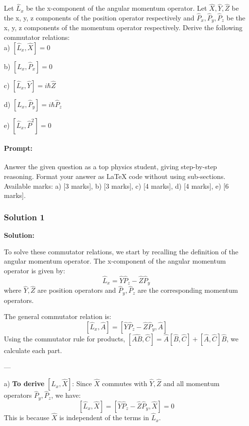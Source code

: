 \documentclass{article}
\begin{document}
Let $\hat{L}_x$ be the x-component of the angular momentum operator. Let $\hat{X}, \hat{Y}, \hat{Z}$ be the x, y, z components of the position operator respectively and $\hat{P}_x, \hat{P}_y, \hat{P}_z$ be the x, y, z components of the momentum operator respectively. Derive the following commutator relations:   \\

a) $\left[\hat{L}_x, \hat{X}\right] = 0$  

b) $\left[\hat{L}_x, \hat{P}_x\right] = 0$  

c) $\left[\hat{L}_x, \hat{Y}\right] = i\hbar \hat{Z}$  

d) $\left[\hat{L}_x, \hat{P}_y\right] = i\hbar \hat{P}_z$  

e) $\left[\hat{L}_x, \hat{P}^2\right] = 0$

\paragraph{Prompt: \\} 
Answer the given question as a top physics student, giving step-by-step reasoning. Format your answer as LaTeX code without using sub-sections. Available marks: a) [3 marks], b) [3 marks], c) [4 marks], d) [4 marks], e) [6 marks].

\subsubsection{Solution 1}
\textbf{Solution:}

To solve these commutator relations, we start by recalling the definition of the angular momentum operator. The x-component of the angular momentum operator is given by:
\[
\hat{L}_x = \hat{Y}\hat{P}_z - \hat{Z}\hat{P}_y
\]
where $\hat{Y}, \hat{Z}$ are position operators and $\hat{P}_y, \hat{P}_z$ are the corresponding momentum operators.

The general commutator relation is:
\[
[\hat{L}_x, \hat{A}] = [\hat{Y}\hat{P}_z - \hat{Z}\hat{P}_y, \hat{A}]
\]
Using the commutator rule for products, $[\hat{AB}, \hat{C}] = \hat{A}[\hat{B}, \hat{C}] + [\hat{A}, \hat{C}]\hat{B}$, we calculate each part.

---

a) \textbf{To derive} $\left[\hat{L}_x, \hat{X}\right]$:  
Since $\hat{X}$ commutes with $\hat{Y}, \hat{Z}$ and all momentum operators $\hat{P}_y, \hat{P}_z$, we have:
\[
[\hat{L}_x, \hat{X}] = [\hat{Y}\hat{P}_z - \hat{Z}\hat{P}_y, \hat{X}] = 0
\]
This is because $\hat{X}$ is independent of the terms in $\hat{L}_x$.  
\end{document}
